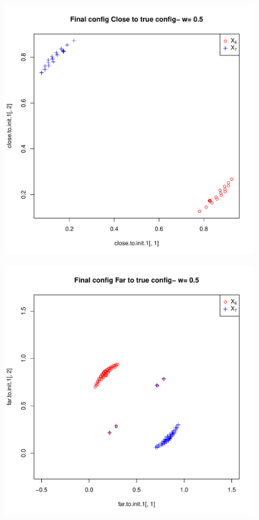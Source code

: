 \documentclass[12pt,oneside,final]{thesis}
\begin{document}
\begin{figure}
\begin{minipage}[b]{0.5\linewidth}
\centering
\includegraphics[scale=0.45]{true-min-w0_5}

\label{fig:Finalconfig-MultMin-w-0_5_a}

\end{minipage}
\hspace{0.5cm}
\begin{minipage}[b]{0.5\linewidth}
\centering
\includegraphics[scale=0.45]{other-min-w0_5.pdf}


\end{minipage}
\end{figure}
\end{document}
